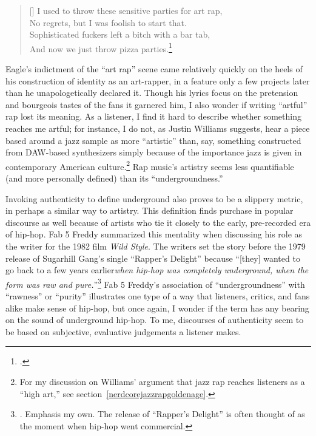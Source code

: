 \settowidth{\versewidth}{I used to throw these sensitive parties for art rap,}
    \begin{verse}[\versewidth]
        I used to throw these sensitive parties for art rap, \\
        No regrets, but I was foolish to start that. \\
        Sophisticated fuckers left a bitch with a bar tab, \\
        And now we just throw pizza parties.\footnote{
        \cite{milo2013}.}
    \end{verse}
Eagle's indictment of the ``art rap'' scene came relatively quickly on the heels of his construction of
identity as an art-rapper, in a feature only a few projects later than he unapologetically declared
it. Though his lyrics focus on the pretension and bourgeois tastes of the fans it garnered him, I also 
wonder if writing ``artful'' rap lost its meaning. As a listener, I find it hard to describe whether
something reaches me artful; for instance, I do not, as Justin Williams suggests, hear a piece based around
a jazz sample as more ``artistic'' than, say, something constructed from DAW-based synthesizers simply
because of the importance jazz is given in contemporary American culture.\footnote{
    For my discussion on Williams' argument that jazz rap reaches listeners as a ``high art,'' see
    section~\ref{nerdcorejazzrapgoldenage}.} 
Rap music's artistry seems less quantifiable (and more personally defined) than its ``undergroundness.''

Invoking authenticity to define underground also proves to be a slippery metric, in perhaps a similar way
to artistry. This definition finds purchase in popular discourse as well because of artists who tie it
closely to the early, pre-recorded era of hip-hop. Fab 5 Freddy summarized this mentality when discussing 
his role as the writer for the 1982 film \textit{Wild Style}. The writers set the story before the 1979
release of Sugarhill Gang's single ``Rapper's Delight'' because ``[they] wanted to go back to a few years 
earlier\textellipsis \emph{when hip-hop was completely underground, when the form was raw and pure.}''\footnote{
    \autocite[23]{justinawilliamsRhyminStealinMusical2013}. Emphasis my own. The release
    of ``Rapper's Delight'' is often thought of as the moment when hip-hop went commercial.}
Fab 5 Freddy's association of ``undergroundness'' with ``rawness'' or ``purity'' illustrates one type
of a way that listeners, critics, and fans alike make sense of hip-hop, but once again, I wonder if the
term has any bearing on the sound of underground hip-hop. To me, discourses of authenticity seem to be
based on subjective, evaluative judgements a listener makes.

